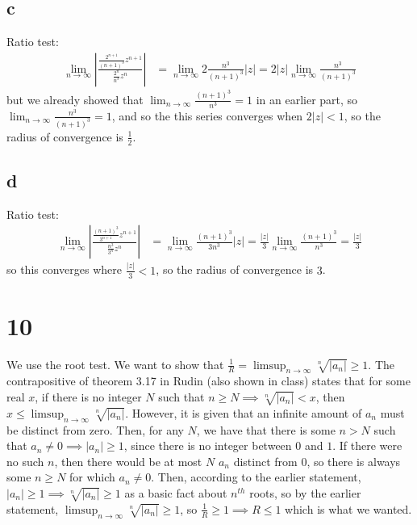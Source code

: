 \documentclass[12pt,letterpaper]{article}
\theoremstyle{definition}
\begin{document}
\subsection*{c}

Ratio test:
\begin{align*}
  \lim_{n \rightarrow \infty}\left|\frac{\frac{2^{n+1}}{(n+1)^{3}}z^{n+1}}{\frac{2^{n}}{n^{3}}z^{n}}\right| &= \lim_{n \rightarrow \infty} 2\frac{n^{3}}{(n+1)^{3}}|z| = 2|z|\lim_{n \rightarrow \infty} \frac{n^{3}}{(n+1)^{3}}
\end{align*}
but we already showed that $\lim_{n \rightarrow \infty} \frac{(n+1)^{3}}{n^{3}} = 1$ in an earlier part, so $\lim_{n \rightarrow \infty}\frac{n^{3}}{(n+1)^{3}} = 1$, and so the this series converges when $2|z| < 1$, so the radius of convergence is $\frac{1}{2}$.

\subsection*{d}

Ratio test:
\begin{align*}
  \lim_{n \rightarrow \infty}\left|\frac{\frac{(n+1)^{3}}{3^{n+1}}z^{n+1}}{\frac{n^{3}}{3^{n}}z^{n}}\right| &= \lim_{n \rightarrow \infty} \frac{(n+1)^{3}}{3n^{3}}|z| = \frac{|z|}{3}\lim_{n \rightarrow \infty} \frac{(n+1)^{3}}{n^{3}} = \frac{|z|}{3}
\end{align*}
so this converges where $\frac{|z|}{3} < 1$, so the radius of convergence is $3$.

\section*{10}

We use the root test. We want to show that $\frac{1}{R} = \limsup_{n \rightarrow \infty}\sqrt[n]{|a_{n}|} \geq 1$. The contrapositive of theorem 3.17 in Rudin (also shown in class) states that for some real $x$, if there is no integer $N$ such that $n \geq N \implies \sqrt[n]{|a_{n}|} < x$, then $x \leq \limsup_{n \rightarrow \infty}\sqrt[n]{|a_{n}|}$. However, it is given that an infinite amount of $a_{n}$ must be distinct from zero. Then, for any $N$, we have that there is some $n > N$ such that $a_{n} \neq 0 \implies |a_{n}| \geq 1$, since there is no integer between $0$ and $1$. If there were no such $n$, then there would be at most $N$ $a_{n}$ distinct from $0$, so there is always some $n \geq N$ for which $a_{n} \neq 0$. Then, according to the earlier statement, $|a_{n}| \geq 1 \implies \sqrt[n]{|a_{n}|} \geq 1$ as a basic fact about $n^{th}$ roots, so by the earlier statement, $\limsup_{n \rightarrow \infty}\sqrt[n]{|a_{n}|} \geq 1$, so $\frac{1}{R} \geq 1 \implies R \leq 1$ which is what we wanted.
\end{document}

